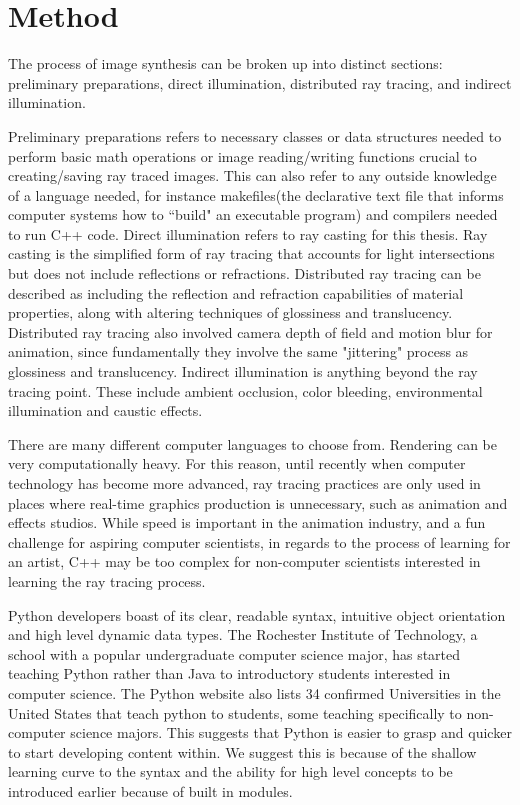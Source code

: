 \documentclass{article}
\begin{document}
\section{Method}
The process of image synthesis can be broken up into distinct sections: preliminary preparations, direct illumination, distributed ray tracing, and indirect illumination.

Preliminary preparations refers to necessary classes or data structures needed to perform basic math operations or image reading/writing functions crucial to creating/saving ray traced images.  This can also refer to any outside knowledge of a language needed, for instance makefiles(the declarative text file that informs computer systems how to ``build" an executable program) and compilers needed to run C++ code.  Direct illumination refers to ray casting for this thesis.  Ray casting is the simplified form of ray tracing that accounts for light intersections but does not include reflections or refractions.  Distributed ray tracing can be described as including the reflection and refraction capabilities of material properties, along with altering techniques of glossiness and translucency.  Distributed ray tracing also involved camera depth of field and motion blur for animation, since fundamentally they involve the same "jittering" process as glossiness and translucency.  Indirect illumination is anything beyond the ray tracing point.  These include ambient occlusion, color bleeding, environmental illumination and caustic effects.

There are many different computer languages to choose from.  Rendering can be very computationally heavy.  For this reason, until recently when computer technology has become more advanced, ray tracing practices are only used in places where real-time graphics production is unnecessary, such as animation and effects studios.  While speed is important in the animation industry, and a fun challenge for aspiring computer scientists, in regards to the process of learning for an artist, C++ may be too complex for non-computer scientists interested in learning the ray tracing process.

Python developers boast of its clear, readable syntax, intuitive object orientation and high level dynamic data types. The Rochester Institute of Technology, a school with a popular undergraduate computer science major, has started teaching Python rather than Java to introductory students interested in computer science.  The Python website also lists 34 confirmed Universities in the United States that teach python to students, some teaching specifically to non-computer science majors. This suggests that Python is easier to grasp and quicker to start developing content within.  We suggest this is because of the shallow learning curve to the syntax and the ability for high level concepts to be introduced earlier because of built in modules.
\end{document}
